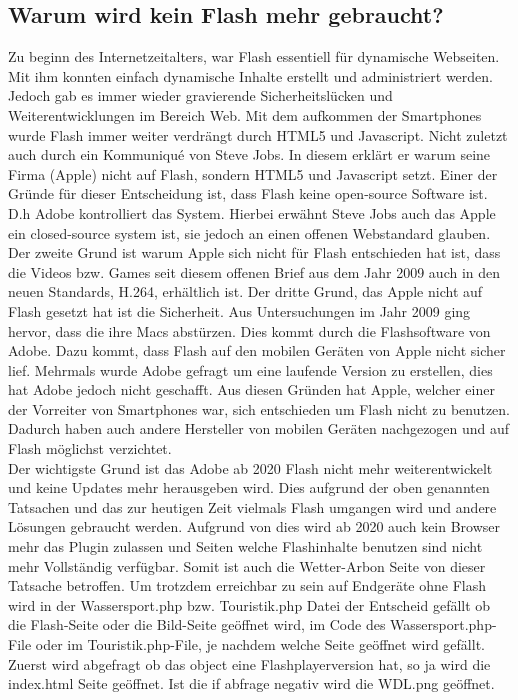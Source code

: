 \documentclass[a4paper,ngerman, 11pt]{report}
\begin{document}
\subsection{Warum wird kein Flash mehr gebraucht?}
Zu beginn des Internetzeitalters, war Flash essentiell für dynamische Webseiten. Mit ihm konnten einfach dynamische Inhalte erstellt und administriert werden. Jedoch gab es immer wieder gravierende Sicherheitslücken und Weiterentwicklungen im Bereich Web. Mit dem aufkommen der Smartphones wurde Flash immer weiter verdrängt durch HTML5 und Javascript. Nicht zuletzt auch durch ein Kommuniqué von Steve Jobs. In diesem erklärt er warum seine Firma (Apple) nicht auf Flash, sondern HTML5 und Javascript setzt. Einer der Gründe für dieser Entscheidung ist, dass Flash keine open-source Software ist. D.h Adobe kontrolliert das System. Hierbei erwähnt Steve Jobs auch das Apple ein closed-source system ist, sie jedoch an einen offenen Webstandard glauben. Der zweite Grund ist warum Apple sich nicht für Flash entschieden hat ist, dass die Videos bzw. Games seit diesem offenen Brief aus dem Jahr 2009 auch in den neuen Standards, H.264, erhältlich ist. Der dritte Grund, das Apple nicht auf Flash gesetzt hat ist die Sicherheit. Aus Untersuchungen im Jahr 2009 ging hervor, dass die ihre Macs abstürzen. Dies kommt durch die Flashsoftware von Adobe. Dazu kommt, dass Flash auf den mobilen Geräten von Apple nicht sicher lief. Mehrmals wurde Adobe gefragt um eine laufende Version zu erstellen, dies hat Adobe jedoch nicht geschafft. Aus diesen Gründen hat Apple, welcher einer der Vorreiter von Smartphones war, sich entschieden um Flash nicht zu benutzen. Dadurch haben auch andere Hersteller von mobilen Geräten nachgezogen und auf Flash möglichst verzichtet. \cite{Apple:ThoughtsOnFlash} \\
Der wichtigste Grund ist das Adobe ab 2020 Flash nicht mehr weiterentwickelt und keine Updates mehr herausgeben wird. Dies aufgrund der oben genannten Tatsachen und das zur heutigen Zeit vielmals Flash umgangen wird und andere Lösungen gebraucht werden. Aufgrund von dies wird ab 2020 auch kein Browser mehr das Plugin zulassen und Seiten welche Flashinhalte benutzen sind nicht mehr Vollständig verfügbar. Somit ist auch die Wetter-Arbon Seite von dieser Tatsache betroffen. Um trotzdem erreichbar zu sein auf Endgeräte ohne Flash wird in der Wassersport.php bzw. Touristik.php Datei der Entscheid gefällt ob die Flash-Seite oder die Bild-Seite geöffnet wird, im Code des Wassersport.php-File oder im Touristik.php-File, je nachdem welche Seite geöffnet wird gefällt. Zuerst wird abgefragt ob das object eine Flashplayerversion hat, so ja wird die index.html Seite geöffnet. Ist die if abfrage negativ wird die WDL.png geöffnet.
\end{document}
